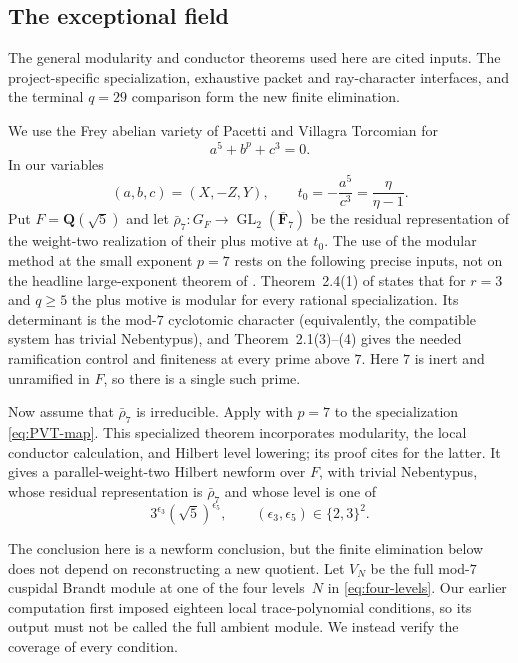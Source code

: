 \documentclass[11pt]{article}
\newcommand{\Q}{\mathbf Q}
\newcommand{\F}{\mathbf F}
\theoremstyle{definition}
\theoremstyle{remark}
\begin{document}
\subsection{The exceptional field}

The general modularity and conductor theorems used here are cited inputs.
The project-specific specialization, exhaustive packet and ray-character
interfaces, and the terminal $q=29$ comparison form the new finite
elimination.

We use the Frey abelian variety of Pacetti and Villagra Torcomian
\cite{PVT} for
\begin{equation}\label{eq:PVT-equation}
                             a^5+b^p+c^3=0.
\end{equation}
In our variables
\begin{equation}\label{eq:PVT-map}
                (a,b,c)=(X,-Z,Y),\qquad
                t_0=-\frac{a^5}{c^3}=\frac{\eta}{\eta-1}.
\end{equation}
Put $F=\Q(\sqrt5)$ and let
\(\bar\rho_7:G_F\to\operatorname{GL}_2(\overline{\F}_7)\) be the residual
representation of the weight-two realization of their plus motive at $t_0$.  The use of the modular
method at the small exponent $p=7$ rests on the following precise inputs,
not on the headline large-exponent theorem of \cite{PVT}.
Theorem~2.4(1) of \cite{PVT} states that for $r=3$ and $q\geq5$ the plus
motive is modular for every rational specialization.  Its determinant is
the mod-$7$ cyclotomic character (equivalently, the compatible system has
trivial Nebentypus), and Theorem~2.1(3)--(4) gives the needed ramification
control and finiteness at every prime above $7$.  Here $7$ is inert and
unramified in $F$, so there is a single such prime.

Now assume that $\bar\rho_7$ is irreducible.  Apply
\cite[Theorem~7.8]{PVT} with $p=7$ to the specialization
\eqref{eq:PVT-map}.  This specialized theorem incorporates modularity,
the local conductor calculation, and Hilbert level lowering; its proof
cites \cite{BreuilDiamond} for the latter.  It gives a parallel-weight-two
Hilbert newform over $F$, with trivial Nebentypus,
whose residual representation is $\bar\rho_7$ and whose level is one of
\begin{equation}\label{eq:four-levels}
 3^{\epsilon_3}(\sqrt5)^{\epsilon_5},\qquad
 (\epsilon_3,\epsilon_5)\in\{2,3\}^2.
\end{equation}

The conclusion here is a newform conclusion, but the finite elimination below
does not depend on reconstructing a new quotient.  Let $V_N$ be the full
mod-$7$ cuspidal Brandt module at one of the four levels~$N$ in
\eqref{eq:four-levels}.  Our earlier computation first imposed eighteen
local trace-polynomial conditions, so its output must not be called the full
ambient module.  We instead verify the coverage of every condition.
\end{document}
